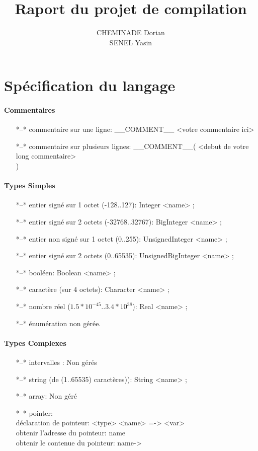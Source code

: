 \documentclass[10pt,a4paper]{report}
\author{CHEMINADE Dorian \\ SENEL Yasin}
\title{Raport du projet de compilation}
\begin{document}
\maketitle
\section{Spécification du langage}


\paragraph{Commentaires}
\begin{itemize}
\item[*--*]commentaire sur une ligne: \_\_COMMENT\_\_ <votre commentaire ici>
\item[*--*]commentaire sur plusieurs lignes: \_\_COMMENT\_\_( <debut de votre long commentaire>\\<fin de votre long commentaire> )
\end{itemize}

\paragraph{Types Simples}
\begin{itemize}
\item[*--*]entier signé sur 1 octet (-128..127): Integer <name> ;
\item[*--*]entier signé sur 2 octets (-32768..32767): BigInteger <name> ;
\item[*--*]entier non signé sur 1 octet (0..255): UnsignedInteger <name> ;
\item[*--*]entier signé sur 2 octets (0..65535): UnsignedBigInteger <name> ;
\item[*--*]booléen: Boolean <name> ;
\item[*--*]caractère (sur 4 octets): Character <name> ;
\item[*--*]nombre réel ($1.5*10^{-45}..3.4*10^{38}$): Real <name> ;
\item[*--*]énumération non gérée.
	
\end{itemize}

\paragraph{Types Complexes}
\begin{itemize}
\item[*--*]intervalles : Non gérés
\item[*--*]string (de (1..65535) caractères)): String <name> ;
\item[*--*]array: Non géré
\item[*--*]pointer: 
	\\déclaration de pointeur: <type> <name> =-> <var>
	\\obtenir l'adresse du pointeur: name
	\\obtenir le contenue du pointeur: name->
\end{itemize}
\end{document}

